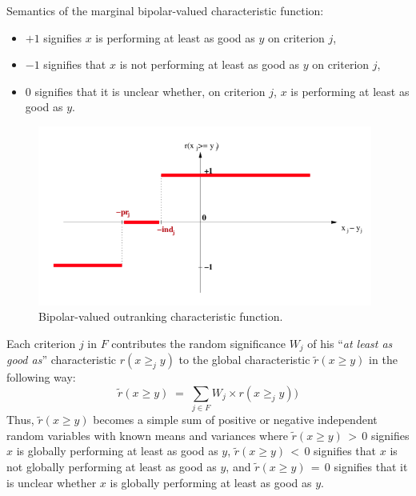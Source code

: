 Semantics of the marginal bipolar-valued characteristic function:
\begin{itemize}
\item $+1$ signifies $x$ is performing at least as good as $y$ on criterion $j$,
\item $-1$ signifies that $x$ is not performing at least as good as $y$ on criterion $j$,
\item $0$ signifies that it is unclear whether, on criterion $j$, $x$ is performing at least as good as $y$.
\end{itemize}
\begin{figure}[h]
\includegraphics[width=11cm]{Figures/rCharacteristic.png}
\caption{Bipolar-valued outranking characteristic function.}
\label{fig:18.2}       %
\end{figure}
Each criterion $j$ in $F$ contributes the random significance $W_j$ of his ``\emph{at least as good as}'' characteristic $r(x \geq_j y)$ to the global characteristic $\tilde{r}(x \geq y)$ in the following way:
\begin{equation}
      \tilde{r}(x \geq y) \; = \; \sum_{j \in F} W_j \times r(x \geq_j y) )
    \end{equation}
Thus, $\tilde{r}(x \geq y)$ becomes a simple sum of positive or negative independent random variables with known means and variances where $\tilde{r}(x \geq y) \, > \, 0$ signifies $x$ is globally performing at least as good as $y$, $\tilde{r}(x \geq y) \, < \, 0$ signifies that $x$ is not globally performing at least as good as $y$, and $\tilde{r}(x \geq y)\,=\,0$ signifies that it is unclear whether $x$ is globally performing at least as good as $y$.

